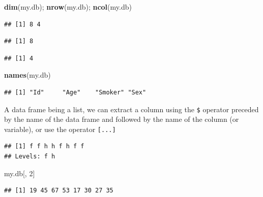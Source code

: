 \documentclass[]{book}
\newenvironment{Shaded}{\begin{snugshade}}{\end{snugshade}}
\newcommand{\CommentTok}[1]{\textcolor[rgb]{0.56,0.35,0.01}{\textit{#1}}}
\newcommand{\DecValTok}[1]{\textcolor[rgb]{0.00,0.00,0.81}{#1}}
\newcommand{\KeywordTok}[1]{\textcolor[rgb]{0.13,0.29,0.53}{\textbf{#1}}}
\newcommand{\NormalTok}[1]{#1}
\newcommand{\OperatorTok}[1]{\textcolor[rgb]{0.81,0.36,0.00}{\textbf{#1}}}
\begin{document}
\begin{Shaded}
\begin{Highlighting}[]
\KeywordTok{dim}\NormalTok{(my.db); }\KeywordTok{nrow}\NormalTok{(my.db); }\KeywordTok{ncol}\NormalTok{(my.db)}
\end{Highlighting}
\end{Shaded}

\begin{verbatim}
## [1] 8 4
\end{verbatim}

\begin{verbatim}
## [1] 8
\end{verbatim}

\begin{verbatim}
## [1] 4
\end{verbatim}

\begin{Shaded}
\begin{Highlighting}[]
\KeywordTok{names}\NormalTok{(my.db)}
\end{Highlighting}
\end{Shaded}

\begin{verbatim}
## [1] "Id"     "Age"    "Smoker" "Sex"
\end{verbatim}

A data frame being a list, we can extract a column using the \texttt{\$} operator preceded by the name of the data frame and followed by the name of the column (or variable), or use the operator \texttt{{[}...{]}}

\begin{Shaded}
\end{Shaded}

\begin{verbatim}
## [1] f f h h f h f f
## Levels: f h
\end{verbatim}

\begin{Shaded}
\begin{Highlighting}[]
\NormalTok{my.db[, }\DecValTok{2}\NormalTok{]}
\end{Highlighting}
\end{Shaded}

\begin{verbatim}
## [1] 19 45 67 53 17 30 27 35
\end{verbatim}
\end{document}
